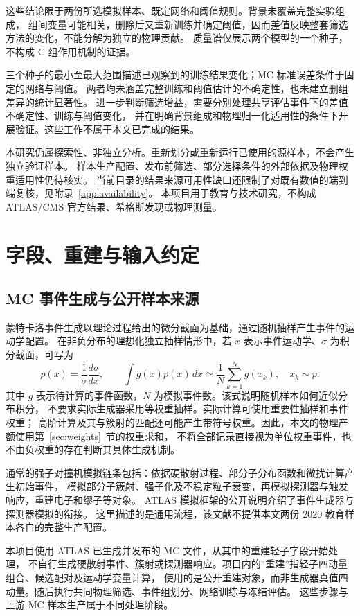 \documentclass[11pt,a4paper,fontset=fandol,scheme=plain]{ctexart}
\begin{document}
这些结论限于两份所选模拟样本、既定网络和阈值规则。背景未覆盖完整实验组成，
组间变量可能相关，删除后又重新训练并确定阈值，因而差值反映整套筛选方法的变化，不能分解为独立的物理贡献。
质量谱仅展示两个模型的一个种子，不构成 C 组作用机制的证据。

三个种子的最小至最大范围描述已观察到的训练结果变化；MC 标准误差条件于固定的网络与阈值。
两者均未涵盖完整训练和阈值估计的不确定性，也未建立删组差异的统计显著性。
进一步判断筛选增益，需要分别处理共享评估事件下的差值不确定性、训练与阈值变化，
并在明确背景组成和物理归一化适用性的条件下开展验证。这些工作不属于本文已完成的结果。

本研究仍属探索性、非独立分析。重新划分或重新运行已使用的源样本，不会产生独立验证样本。
样本生产配置、发布前筛选、部分选择条件的外部依据及物理权重适用性仍待核实。
当前目录的结果来源可用性缺口还限制了对既有数值的端到端复核，见附录~\ref{app:availability}。
本项目用于教育与技术研究，不构成 ATLAS/CMS 官方结果、希格斯发现或物理测量。

\clearpage
\appendix

\section{字段、重建与输入约定}\label{app:fields}

\subsection{MC 事件生成与公开样本来源}\label{app:mc-generation}
蒙特卡洛事件生成以理论过程给出的微分截面为基础，通过随机抽样产生事件的运动学配置。
在非负分布的理想化独立抽样情形中，若 $x$ 表示事件运动学、$\sigma$ 为积分截面，可写为
\[
 p(x)=\frac{1}{\sigma}\frac{d\sigma}{dx},\qquad
 \int g(x)p(x)\,dx\simeq\frac{1}{N}\sum_{k=1}^{N}g(x_k),\quad x_k\sim p.
\]
其中 $g$ 表示待计算的事件函数，$N$ 为模拟事件数。该式说明随机样本如何近似分布积分，
不要求实际生成器采用等权重抽样。实际计算可使用重要性抽样和事件权重；
高阶计算及其与簇射的匹配还可能产生带符号权重。因此，本文的物理产额使用第~\ref{sec:weights}~节的权重求和，
不将全部记录直接视为单位权重事件，也不由负权重的存在判断其具体生成机制。

通常的强子对撞机模拟链条包括：依据硬散射过程、部分子分布函数和微扰计算产生初始事件，
模拟部分子簇射、强子化及不稳定粒子衰变，再模拟探测器与触发响应，重建电子和缪子等对象。
ATLAS 模拟框架的公开说明介绍了事件生成器与探测器模拟的衔接\cite{ATLASSimulation}。
这里描述的是通用流程，该文献不提供本文两份 2020 教育样本各自的完整生产配置。

本项目使用 ATLAS 已生成并发布的 MC 文件，从其中的重建轻子字段开始处理，
不自行生成硬散射事件、簇射或探测器响应。项目内的“重建”指轻子四动量组合、候选配对及运动学变量计算，
使用的是公开重建对象，而非生成器真值四动量。随后执行共同物理筛选、事件组划分、网络训练与冻结评估。
这些步骤与上游 MC 样本生产属于不同处理阶段。
\end{document}
